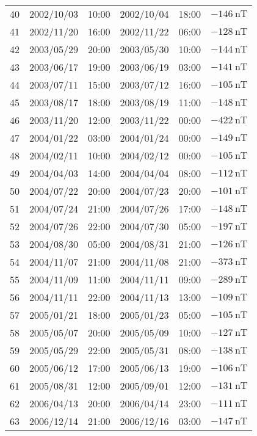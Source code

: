 \begin{table}[ht]
\begin{adjustbox}{width=\textwidth,totalheight=0.95\textheight,keepaspectratio}
\begin{tabular}{cccccc}
    40 & 2002/10/03 & 10:00 & 2002/10/04 & 18:00 & $ \SI{-146}{\nano\tesla}$ \\
    41 & 2002/11/20 & 16:00 & 2002/11/22 & 06:00 & $ \SI{-128}{\nano\tesla}$ \\
    42 & 2003/05/29 & 20:00 & 2003/05/30 & 10:00 & $ \SI{-144}{\nano\tesla}$ \\
    43 & 2003/06/17 & 19:00 & 2003/06/19 & 03:00 & $ \SI{-141}{\nano\tesla}$ \\
    44 & 2003/07/11 & 15:00 & 2003/07/12 & 16:00 & $ \SI{-105}{\nano\tesla}$ \\
    45 & 2003/08/17 & 18:00 & 2003/08/19 & 11:00 & $ \SI{-148}{\nano\tesla}$ \\
    46 & 2003/11/20 & 12:00 & 2003/11/22 & 00:00 & $ \SI{-422}{\nano\tesla}$ \\
    47 & 2004/01/22 & 03:00 & 2004/01/24 & 00:00 & $ \SI{-149}{\nano\tesla}$ \\
    48 & 2004/02/11 & 10:00 & 2004/02/12 & 00:00 & $ \SI{-105}{\nano\tesla}$ \\
    49 & 2004/04/03 & 14:00 & 2004/04/04 & 08:00 & $ \SI{-112}{\nano\tesla}$ \\
    50 & 2004/07/22 & 20:00 & 2004/07/23 & 20:00 & $ \SI{-101}{\nano\tesla}$ \\
    51 & 2004/07/24 & 21:00 & 2004/07/26 & 17:00 & $ \SI{-148}{\nano\tesla}$ \\
    52 & 2004/07/26 & 22:00 & 2004/07/30 & 05:00 & $ \SI{-197}{\nano\tesla}$ \\
    53 & 2004/08/30 & 05:00 & 2004/08/31 & 21:00 & $ \SI{-126}{\nano\tesla}$ \\
    54 & 2004/11/07 & 21:00 & 2004/11/08 & 21:00 & $ \SI{-373}{\nano\tesla}$ \\
    55 & 2004/11/09 & 11:00 & 2004/11/11 & 09:00 & $ \SI{-289}{\nano\tesla}$ \\
    56 & 2004/11/11 & 22:00 & 2004/11/13 & 13:00 & $ \SI{-109}{\nano\tesla}$ \\
    57 & 2005/01/21 & 18:00 & 2005/01/23 & 05:00 & $ \SI{-105}{\nano\tesla}$ \\
    58 & 2005/05/07 & 20:00 & 2005/05/09 & 10:00 & $ \SI{-127}{\nano\tesla}$ \\
    59 & 2005/05/29 & 22:00 & 2005/05/31 & 08:00 & $ \SI{-138}{\nano\tesla}$ \\
    60 & 2005/06/12 & 17:00 & 2005/06/13 & 19:00 & $ \SI{-106}{\nano\tesla}$ \\
    61 & 2005/08/31 & 12:00 & 2005/09/01 & 12:00 & $ \SI{-131}{\nano\tesla}$ \\
    62 & 2006/04/13 & 20:00 & 2006/04/14 & 23:00 & $ \SI{-111}{\nano\tesla}$ \\
    63 & 2006/12/14 & 21:00 & 2006/12/16 & 03:00 & $ \SI{-147}{\nano\tesla}$ \\ \hline
    \end{tabular}%
    \end{adjustbox}
    \end{table}
    

%
%
